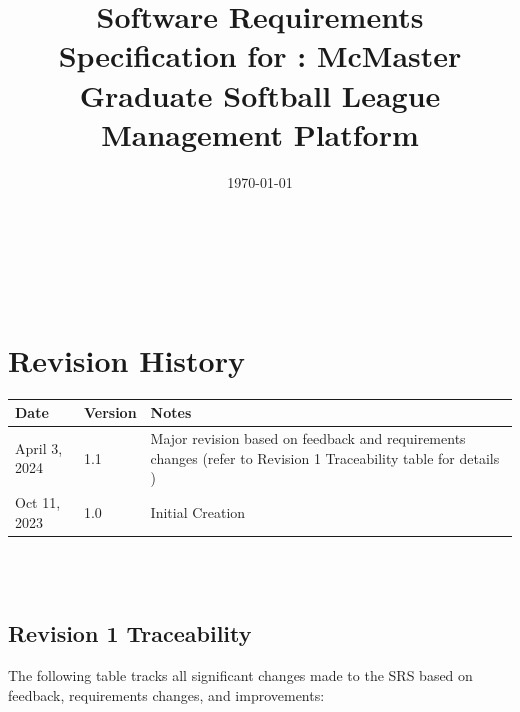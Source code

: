 \documentclass[12pt, titlepage]{article}
\begin{document}
\title{Software Requirements Specification for \progname: McMaster Graduate Softball League Management Platform} 
\author{\authname}
\date{\today}
	
\maketitle

~\newpage


\tableofcontents

\listoftables

~\newpage

\section*{Revision History}

\begin{tabularx}{\textwidth}{p{3cm}p{2cm}X}
\toprule {\textbf{Date}} & {\textbf{Version}} & {\textbf{Notes}}\\
\midrule
April 3, 2024 & 1.1 & Major revision based on feedback and requirements changes (refer to Revision 1 Traceability table for details )\\
Oct 11, 2023 & 1.0 & Initial Creation \\
\bottomrule
\end{tabularx}

~\\

~\newpage

\subsection{Revision 1 Traceability}
The following table tracks all significant changes made to the SRS based on feedback, requirements changes, and improvements:
\end{document}
